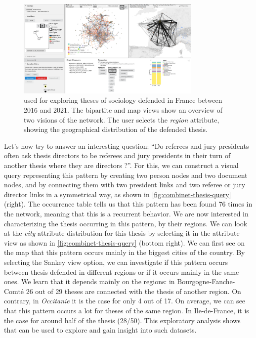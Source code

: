 \begin{figure}[!ht]
    \centering
    \includegraphics[width=0.8\textwidth]{static/figures/ComBiNet/Thesis-first-exploration}
    \caption{\name used for exploring theses of sociology defended in France between 2016 and 2021. The bipartite and map views show an overview of two visions of the network. The user selects the \textit{region} attribute, showing the geographical distribution of the defended thesis.}\label{fig:combinet-thesis-exploration}
\end{figure}

Let's now try to answer an interesting question: ``Do referees and jury presidents often ask thesis directors to be referees and jury presidents in their turn of another thesis where they are directors ?''.
For this, we can construct a visual query representing this pattern by creating two person nodes and two document nodes, and by connecting them with two president links and two referee or jury director links in a symmetrical way, as shown in \autoref{fig:combinet-thesis-query} (right).
The occurrence table tells us that this pattern has been found 76 times in the network, meaning that this is a recurrent behavior.
We are now interested in characterizing the thesis occurring in this pattern, by their regions.
We can look at the \textit{city} attribute distribution for this thesis by selecting it in the attribute view as shown in \autoref{fig:combinet-thesis-query} (bottom right).
We can first see on the map that this pattern occurs mainly in the biggest cities of the country.
By selecting the Sankey view option, we can investigate if this pattern occurs between thesis defended in different regions or if it occurs mainly in the same ones.
We learn that it depends mainly on the regions: in Bourgogne-Fanche-Comté 26 out of 29 theses are connected with the thesis of another region.
On contrary, in \textit{Occitanie} it is the case for only 4 out of 17.
On average, we can see that this pattern occurs a lot for theses of the same region.
In Ile-de-France, it is the case for around half of the thesis (28/50).
This exploratory analysis shows that \name can be used to explore and gain insight into such datasets.



